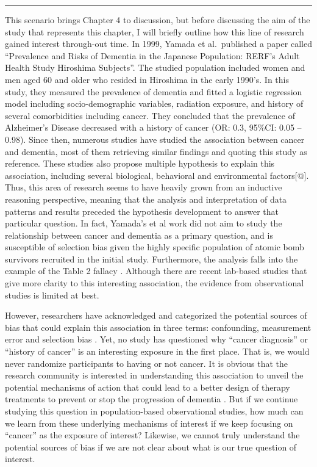 \documentclass[
]{book}
\begin{document}
\begin{center}\rule{0.5\linewidth}{0.5pt}\end{center}

This scenario brings Chapter 4 to discussion, but before discussing the aim of the study that represents this chapter, I will briefly outline how this line of research gained interest through-out time. In 1999, Yamada et al.~published a paper called ``Prevalence and Risks of Dementia in the Japanese Population: RERF's Adult Health Study Hiroshima Subjects''\autocite{yamada1999}. The studied population included women and men aged 60 and older who resided in Hiroshima in the early 1990's. In this study, they measured the prevalence of dementia and fitted a logistic regression model including socio-demographic variables, radiation exposure, and history of several comorbidities including cancer. They concluded that the prevalence of Alzheimer's Disease decreased with a history of cancer (OR: 0.3, 95\%CI: 0.05 -- 0.98). Since then, numerous studies have studied the association between cancer and dementia, most of them retrieving similar findings \autocite{ospina2020,vanderwillik2018} and quoting this study as reference. These studies also propose multiple hypothesis to explain this association, including several biological, behavioral and environmental factors{[}@{]}. Thus, this area of research seems to have heavily grown from an inductive reasoning perspective, meaning that the analysis and interpretation of data patterns and results preceded the hypothesis development to answer that particular question\autocite{banegas2000}. In fact, Yamada's et al work did not aim to study the relationship between cancer and dementia as a primary question, and is susceptible of selection bias given the highly specific population of atomic bomb survivors recruited in the initial study. Furthermore, the analysis falls into the example of the Table 2 fallacy \autocite{westreich2012}. Although there are recent lab-based studies that give more clarity to this interesting association, the evidence from observational studies is limited at best.

However, researchers have acknowledged and categorized the potential sources of bias that could explain this association in three terms: confounding, measurement error and selection bias \autocite{ganguli2015,driverbiogeront2014,frain2017,ospina2020}. Yet, no study has questioned why ``cancer diagnosis'' or ``history of cancer'' is an interesting exposure in the first place. That is, we would never randomize participants to having or not cancer. It is obvious that the research community is interested in understanding this association to unveil the potential mechanisms of action that could lead to a better design of therapy treatments to prevent or stop the progression of dementia \autocite{snyder2016}. But if we continue studying this question in population-based observational studies, how much can we learn from these underlying mechanisms of interest if we keep focusing on ``cancer'' as the exposure of interest? Likewise, we cannot truly understand the potential sources of bias if we are not clear about what is our true question of interest.
\end{document}
